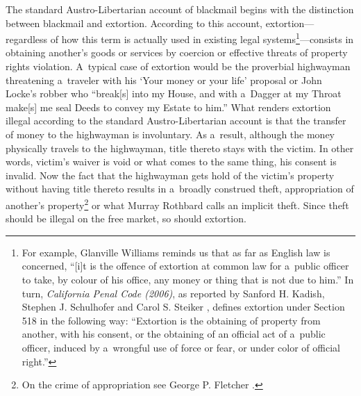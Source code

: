 The standard Austro-Libertarian account of blackmail begins with the distinction between blackmail and extortion. According to this account, extortion---regardless of how this term is actually used in existing legal systems\footnote{For example, Glanville Williams 
\parencite*[][p.838]{williams_textbook_1983} %
 reminds us that as far as English law is concerned, ``[i]t is the offence of extortion at common law for a~public officer to take, by colour of his office, any money or thing that is not due to him.'' In turn, \textit{California Penal Code (2006)}, as reported by Sanford H. Kadish, Stephen J. Schulhofer and Carol S. Steiker 
\parencite*[][p.941]{}, %
 defines extortion under Section 518 in the following way: ``Extortion is the obtaining of property from another, with his consent, or the obtaining of an official act of a~public officer, induced by a~wrongful use of force or fear, or under color of official right.''}---consists in obtaining another's goods or services by coercion or effective threats of property rights violation. A~typical case of extortion would be the proverbial highwayman threatening a~traveler with his ‘Your money or your life' proposal or John Locke's 
\parencite[][p.385 [1698]{} %
 robber who ``break[s] into my House, and with a~Dagger at my Throat make[s] me seal Deeds to convey my Estate to him.'' What renders extortion illegal according to the standard Austro-Libertarian account is that the transfer of money to the highwayman is involuntary. As a~result, although the money physically travels to the highwayman, title thereto stays with the victim. In other words, victim's waiver is void or what comes to the same thing, his consent is invalid. Now the fact that the highwayman gets hold of the victim's property without having title thereto results in a~broadly construed theft, appropriation of another's property\footnote{On the crime of appropriation see George P. Fletcher 
\parencite*[][pp.7–22]{fletcher_rethinking_2000}.%
} or what Murray Rothbard 
\parencite*[][p.77]{rothbard_ethics_1998} %
 calls an implicit theft. Since theft should be illegal on the free market, so should extortion.



